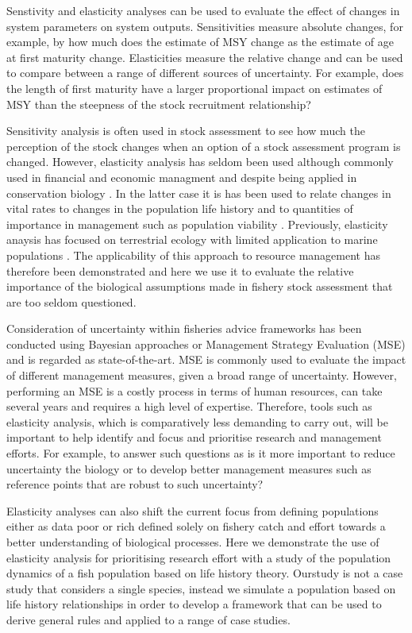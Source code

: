 \documentclass{pnastwo}
\begin{document}
\begin{article}
Senstivity and elasticity analyses can be used to evaluate the effect of changes in system 
parameters on system outputs. Sensitivities measure absolute changes, for example, by how much does 
the estimate of MSY change as the estimate of age at first maturity change. Elasticities measure 
the relative change and can be used to compare between a range of different sources of uncertainty. 
For example, does the length of first maturity have a larger proportional impact on estimates of MSY 
than the steepness of the stock recruitment relationship? 

Sensitivity analysis is often used in stock assessment to see how much the perception of the stock changes
when an option of a stock assessment program is changed. However, elasticity analysis has seldom been used 
although commonly used in financial and economic managment and despite being applied in conservation biology \cite{de1986elasticity}.
In the latter case it is has been used to relate
changes in vital rates to changes in the population life history \cite{grant2003density} and to quantities
of importance in management such as population viability \cite{heppell1998application}. Previously, 
elasticity anaysis has focused on terrestrial ecology \cite{Benton1999467, Hunter2000299, Pichancourt200631} 
with limited application to marine populations \cite{RogersBennett2006, Heppell2007}. The applicability of 
this approach to resource management has therefore been demonstrated and here we use it to evaluate the 
relative importance of the biological assumptions made in fishery stock assessment that are too seldom questioned.

Consideration of uncertainty within fisheries advice frameworks has been conducted using Bayesian approaches 
or Management Strategy Evaluation (MSE) and is regarded as state-of-the-art. MSE is commonly used to evaluate the 
impact of different management measures, given a broad
range of uncertainty. However, performing an MSE is a costly process in terms of human
resources, can take several years and requires a high level of expertise. Therefore, tools 
such as elasticity analysis, which is comparatively less demanding to carry out, will be important 
to help identify and focus and prioritise research and management efforts. For example, to answer such questions as
is it more important to reduce uncertainty the biology or to develop better management measures such 
as reference points that are robust to such uncertainty?  

Elasticity analyses can also shift the current focus from defining populations either as data poor or
rich defined solely on fishery catch and effort towards a better understanding of
biological processes. Here we demonstrate the use of elasticity analysis for
prioritising research effort with a study of the population dynamics of a fish population
based on life history theory. Ourstudy is not a case study that considers a single species, 
instead we simulate a population based on life history relationships in order to develop
a framework that can be used to derive general rules and applied to a range of
case studies.


\end{article}
\end{document}
